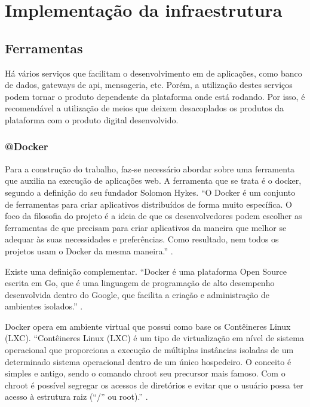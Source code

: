 \chapter{Implementação da infraestrutura}\label{implementação-da-infraestrutura}

\section{Ferramentas}\label{ferramentas}


Há vários serviços que facilitam o desenvolvimento em de aplicações, como banco de dados,
gateways de api, mensageria, etc. Porém, a utilização destes serviços podem
tornar o produto dependente da plataforma onde está rodando. Por isso, é recomendável
a utilização de meios que deixem desacoplados os produtos da plataforma com o produto
digital desenvolvido.

\subsection{@Docker}\label{docker}
Para a construção do trabalho, faz-se necessário abordar sobre uma ferramenta que auxilia na execução de aplicações web.
A ferramenta que se trata é o docker, segundo a definição do seu fundador Solomon Hykes. 
“O Docker é um conjunto de ferramentas para criar aplicativos distribuídos de forma muito específica. O foco da filosofia 
do projeto é a ideia de que os desenvolvedores podem escolher as ferramentas de que precisam para criar aplicativos da 
maneira que melhor se adequar às suas necessidades e preferências. Como resultado, nem todos os projetos usam o Docker
da mesma maneira.” \cite {solomon-hykes}.


Existe uma definição complementar. “Docker é uma plataforma Open Source escrita em Go, que é uma linguagem de
programação de alto desempenho desenvolvida dentro do Google, que facilita a criação e administração de ambientes isolados.”
\cite {mundodocker-01}.


Docker opera em ambiente virtual que possui como base os Contêineres Linux (LXC). “Contêineres Linux (LXC) é um tipo de
virtualização em nível de sistema operacional que proporciona a execução de múltiplas instâncias isoladas de um determinado
sistema operacional dentro de um único hospedeiro. O conceito é simples e antigo, sendo o comando chroot seu precursor mais
famoso. Com o chroot é possível segregar os acessos de diretórios e evitar que o usuário possa ter acesso à estrutura raiz 
(“/” ou root).” \cite {sinestec-01}.


